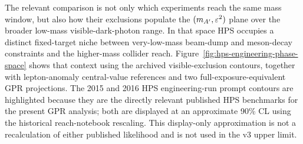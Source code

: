 The relevant comparison is not only which experiments reach the same mass window, but
also how their exclusions populate the $(m_{A^\prime},\varepsilon^2)$ plane over the broader
low-mass visible-dark-photon range. In that space HPS occupies a
distinct fixed-target niche between very-low-mass beam-dump and meson-decay constraints
and the higher-mass collider reach. Figure~\ref{fig:hps-engineering-phase-space}
shows that context using the archived visible-exclusion contours, together with
lepton-anomaly central-value references and two full-exposure-equivalent GPR projections. The 2015 and 2016 HPS engineering-run
prompt contours are highlighted because they are the directly relevant published HPS
benchmarks for the present GPR analysis; both are displayed at an approximate 90\% CL
using the historical reach-notebook rescaling. This display-only approximation is not a
recalculation of either published likelihood and is not used in the v3 upper limit.

